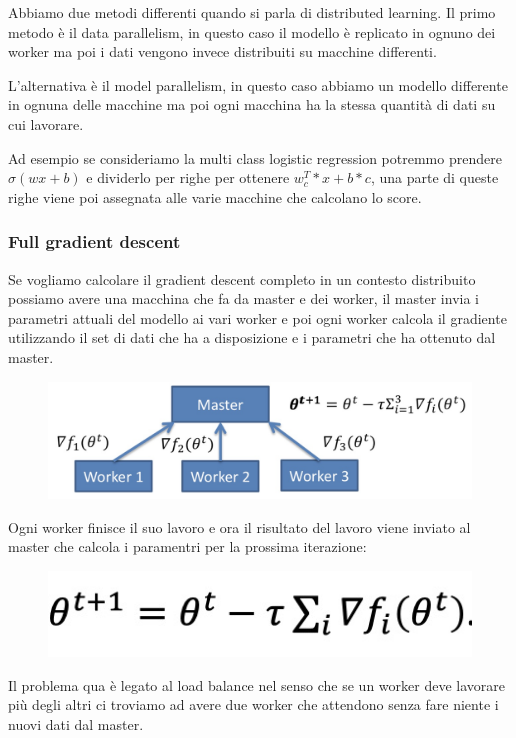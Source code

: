 \documentclass[14pt]{extreport}
\begin{document}
Abbiamo due metodi differenti quando si parla di distributed learning. Il primo metodo è il data parallelism, in questo caso il modello è replicato in
ognuno dei worker ma poi i dati vengono invece distribuiti su macchine differenti.


L'alternativa è il model parallelism, in questo caso abbiamo un modello differente in ognuna delle macchine ma poi ogni macchina ha la stessa quantità
di dati su cui lavorare.

Ad esempio se consideriamo la multi class logistic regression potremmo prendere $\sigma(wx+b)$ e dividerlo per righe per ottenere $w_c^T*x+b*c$, una
parte di queste righe viene poi assegnata alle varie macchine che calcolano lo score.

\subsubsection{Full gradient descent}

Se vogliamo calcolare il gradient descent completo in un contesto distribuito possiamo avere una macchina che fa da master e dei worker, il master
invia i parametri attuali del modello ai vari worker e poi ogni worker calcola il gradiente utilizzando il set di dati che ha a disposizione e i
parametri che ha ottenuto dal master.

\begin{figure}[H]
	\centering
	\includegraphics[width=0.7\linewidth]{273.jpeg}
\end{figure}

Ogni worker finisce il suo lavoro e ora il risultato del lavoro viene inviato al master che calcola i paramentri per la prossima iterazione:

\begin{figure}[H]
	\centering
	\includegraphics[width=0.5\linewidth]{272.jpeg}
\end{figure}

Il problema qua è legato al load balance nel senso che se un worker deve lavorare più degli altri ci troviamo ad avere due worker che attendono senza
fare niente i nuovi dati dal master.
\end{document}

